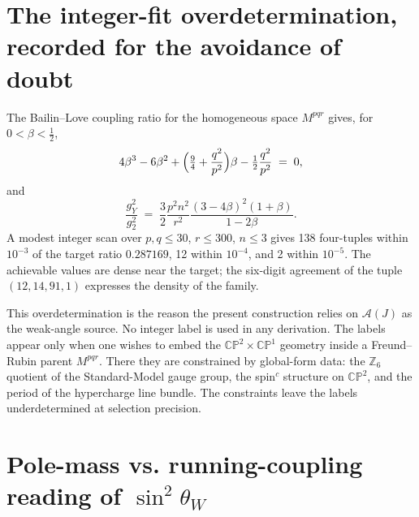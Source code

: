 \documentclass[aps,prd,onecolumn,superscriptaddress,nofootinbib,reprint]{revtex4-2}
\newcommand{\half}{\tfrac12}
\newcommand{\sinsq}{\sin^{2}\!\theta_{W}}
\newcommand{\cA}{\mathcal{A}}
\newcommand{\CP}{\mathbb{CP}}
\newcommand{\Z}{\mathbb{Z}}
\begin{document}
\section{The integer-fit overdetermination, recorded for the avoidance of doubt}
\label{app:scan}

The Bailin--Love coupling ratio for the homogeneous space $M^{pqr}$
gives, for $0<\beta<\half$,
\begin{equation}
  4\beta^{3}-6\beta^{2}+\Bigl(\tfrac94+\frac{q^{2}}{p^{2}}\Bigr)\beta
  -\half\frac{q^{2}}{p^{2}}\;=\;0,
\label{eq:BL}
\end{equation}
and
\begin{equation}
  \frac{g_{Y}^{2}}{g_{2}^{2}}\;=\;
  \frac32\frac{p^{2}n^{2}}{r^{2}}\frac{(3-4\beta)^{2}(1+\beta)}{1-2\beta}.
\label{eq:gYg2}
\end{equation}
A modest integer scan over $p,q\le 30$, $r\le 300$, $n\le 3$ gives 138
four-tuples within $10^{-3}$ of the target ratio $0.287169$, 12 within
$10^{-4}$, and 2 within $10^{-5}$.  The achievable values are dense
near the target; the six-digit agreement of the tuple $(12,14,91,1)$
expresses the density of the family.

This overdetermination is the reason the present construction relies
on $\cA(J)$ as the weak-angle source.  No integer label is used in any
derivation.  The labels appear only when one wishes to embed the
$\CP^{2}\times\CP^{1}$ geometry inside a Freund--Rubin parent
$M^{pqr}$.  There they are constrained by global-form data: the
$\Z_{6}$ quotient of the Standard-Model gauge group, the spin$^{c}$
structure on $\CP^{2}$, and the period of the hypercharge line bundle.
The constraints leave the labels underdetermined at selection
precision.


\section{Pole-mass vs. running-coupling reading of \texorpdfstring{$\sinsq$}{sin2thetaW}}
\label{app:scheme}
\end{document}
